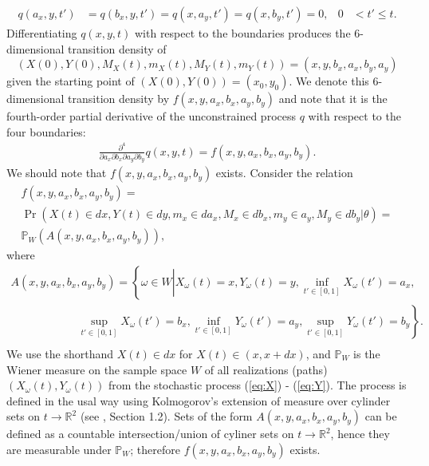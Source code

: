 \begin{align}
  q(a_x, y,t') &= q(b_x,y,t') = q(x,a_y,t') = q(x,b_y,t') = 0, & 0 &< t' \leq t. \label{eq:2}
\end{align}
Differentiating $q(x,y,t)$ with respect to the boundaries produces the
6-dimensional transition density of
\[(X(0), Y(0), M_X(t), m_X(t), M_Y(t), m_Y(t)) =
  (x,y,b_x,a_x,b_y,a_y)\] given the starting point of
$(X(0), Y(0)) = (x_0, y_0)$. We denote this 6-dimensional transition
density by $f(x,y,a_x,b_x,a_y,b_y)$ and note that it is the
fourth-order partial derivative of the unconstrained process $q$ with
respect to the four boundaries:
\begin{align}
  \frac{\partial^4}{\partial a_x \partial b_x \partial a_y \partial b_y} q(x,y,t) = f(x,y,a_x,b_x,a_y,b_y).
  \label{eq:pdf}
\end{align}
We should note that $f(x,y,a_x,b_x,a_y,b_y)$ exists. Consider the relation
\begin{multline*}
  f(x,y,a_x,b_x,a_y,b_y) = \\
  \Pr\left(X(t) \in dx, Y(t) \in dy, m_x \in da_x, M_x \in db_x, m_y
    \in a_y, M_y \in db_y \left| \theta \right.\right) = \\
  \mathbb{P}_{W}\left( A(x,y,a_x,b_x,a_y,b_y) \right),
  \end{multline*}
  where
  \begin{multline*}
    A(x,y,a_x,b_x,a_y,b_y) = \left\{ \omega \in W \left| X_\omega(t) = x,
     Y_\omega(t)=y, \inf_{t'\in [0,1]} X_\omega(t') = a_x, \right.  \right. \\
   \qquad \qquad \qquad \left. \sup_{t'\in [0,1]} X_\omega(t') = b_x, \inf_{t'\in [0,1]}
         Y_\omega(t') = a_y, \sup_{t'\in [0,1]} Y_\omega(t') = b_y
     \right\}. \\
   \end{multline*}
   We use the shorthand $X(t) \in dx$ for $X(t) \in (x, x+dx)$, and
   $\mathbb{P}_{W}$ is the Wiener measure on the sample space $W$ of
   all realizations (paths) $(X_\omega(t), Y_\omega(t))$ from the
   stochastic process (\ref{eq:X}) - (\ref{eq:Y}). The process is defined in the usal
   way using Kolmogorov's extension of measure over cylinder sets on
   $t \to \mathbb{R}^2$ (see \cite{freidlin1985functional}, Section
   1.2). Sets of the form $A(x,y,a_x,b_x,a_y,b_y)$ can be defined as a
   countable intersection/union of cyliner sets on
   $t \to \mathbb{R}^2$, hence they are measurable under
   $\mathbb{P}_{W}$; therefore $f(x,y,a_x,b_x,a_y,b_y)$ exists.

